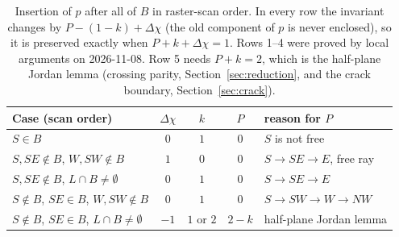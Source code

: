 \documentclass[11pt]{article}
\theoremstyle{definition}
\theoremstyle{remark}
\begin{document}
\begin{table}[h]
\centering
\begin{tabular}{@{}lcccl@{}}
\toprule
Case (scan order) & $\Delta\chi$ & $k$ & $P$ & reason for $P$\\
\midrule
$S\in B$ & $0$ & $1$ & $0$ & $S$ is not free\\
$S,SE\notin B$, $W,SW\notin B$ & $1$ & $0$ & $0$ & $S\to SE\to E$, free ray\\
$S,SE\notin B$, $L\cap B\neq\emptyset$ & $0$ & $1$ & $0$ & $S\to SE\to E$\\
$S\notin B$, $SE\in B$, $W,SW\notin B$ & $0$ & $1$ & $0$ & $S\to SW\to W\to NW$\\
$S\notin B$, $SE\in B$, $L\cap B\neq\emptyset$ & $-1$ & $1$ or $2$ & $2-k$ & half-plane Jordan lemma\\
\bottomrule
\end{tabular}
\caption{Insertion of $p$ after all of $B$ in raster-scan order. In every row the
invariant changes by $P-(1-k)+\Delta\chi$ (the old component of $p$ is never
enclosed), so it is preserved exactly when $P+k+\Delta\chi=1$. Rows 1--4 were proved
by local arguments on 2026-11-08. Row 5 needs $P+k=2$, which is the half-plane Jordan
lemma (crossing parity, Section~\ref{sec:reduction}, and the crack boundary,
Section~\ref{sec:crack}).}
\label{tab:scan}
\end{table}
\end{document}
